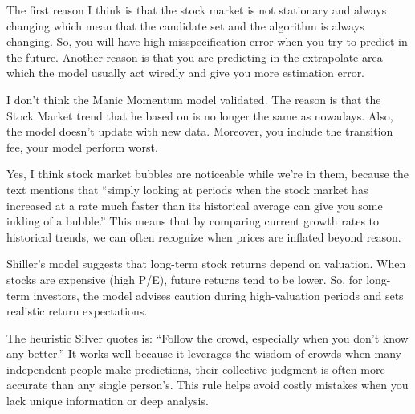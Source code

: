 \documentclass[12pt]{article}
\begin{document}
\begin{enumerate}
The first reason I think is that the stock market is not stationary and always changing which mean that the candidate set and the algorithm is always changing. So, you will have high misspecification error when you try to predict in the future. Another reason is that you are predicting in the extrapolate area which the model usually act wiredly and give you more estimation error.


I don't think the Manic Momentum model validated. The reason is that the Stock Market trend that he based on is no longer the same as nowadays. Also, the model doesn't update with new data. Moreover, you include the transition fee, your model perform worst. 


Yes, I think stock market bubbles are noticeable while we’re in them, because the text mentions that “simply looking at periods when the stock market has increased at a rate much faster than its historical average can give you some inkling of a bubble.” This means that by comparing current growth rates to historical trends, we can often recognize when prices are inflated beyond reason.


Shiller’s model suggests that long-term stock returns depend on valuation. When stocks are expensive (high P/E), future returns tend to be lower. So, for long-term investors, the model advises caution during high-valuation periods and sets realistic return expectations. 


The heuristic Silver quotes is: “Follow the crowd, especially when you don’t know any better.”
It works well because it leverages the wisdom of crowds when many independent people make predictions, their collective judgment is often more accurate than any single person’s. This rule helps avoid costly mistakes when you lack unique information or deep analysis.



\end{enumerate}
\end{document}
